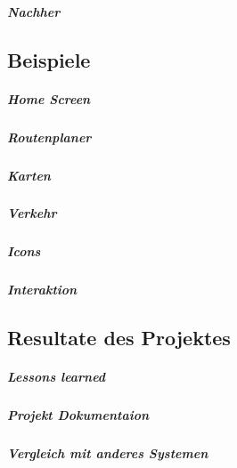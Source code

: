 \subparagraph{Nachher}
\label{subp:nachher}


\subsection{Beispiele}
\label{sub:examples}

\subparagraph{Home Screen}
\label{subp:home_screen}

\subparagraph{Routenplaner}
\label{subp:route_planner}

\subparagraph{Karten}
\label{subp:maps}

\subparagraph{Verkehr}
\label{subp:traffic}

\subparagraph{Icons}
\label{subp:icons}

\subparagraph{Interaktion}
\label{subp:interaction2}

\subsection{Resultate des Projektes} 
\label{sub:results_of_the_project}

\subparagraph{Lessons learned}
\label{subp:lessons_learned}

\subparagraph{Projekt Dokumentaion}
\label{subp:documentation}

\subparagraph{Vergleich mit anderes Systemen}
\label{subp:comparison_to_other_systems}